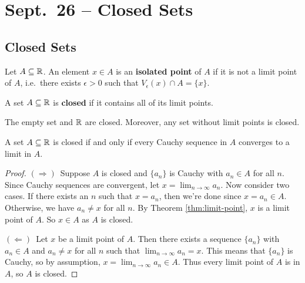 \chapter{Sept.~26 -- Closed Sets}

\section{Closed Sets}

\begin{definition}
  Let $A \subseteq \mathbb{R}$. An element $x \in A$ is
  an \textbf{isolated point} of $A$ if it is not
  a limit point of $A$, i.e.~there exists $\epsilon > 0$
  such that $V_\epsilon(x) \cap A = \{x\}$.
\end{definition}

\begin{definition}
  A set $A \subseteq \mathbb{R}$ is \textbf{closed}
  if it contains all of its limit points.
\end{definition}

\begin{example}
  The empty set and $\mathbb{R}$ are closed. Moreover, any
  set without limit points is closed.
\end{example}

\begin{theorem}
  A set $A \subseteq \mathbb{R}$ is closed if and only if
  every Cauchy sequence in $A$ converges to a
  limit in $A$.
\end{theorem}

\begin{proof}
  $(\Rightarrow)$\, Suppose $A$ is closed and
  $\{a_n\}$ is Cauchy with $a_n \in A$ for all $n$.
  Since Cauchy sequences are convergent, let
  $x = \lim_{n \to \infty} a_n$. Now consider two cases.
  If there exists an $n$ such that $x = a_n$, then we're
  done since $x = a_n \in A$. Otherwise, we have
  $a_n \ne x$ for all $n$. By Theorem \ref{thm:limit-point},
  $x$ is a limit point of $A$. So $x \in A$ as
  $A$ is closed.

  $(\Leftarrow)$\, Let $x$ be a limit point of $A$.
  Then there exists a sequence $\{a_n\}$ with $a_n \in A$
  and $a_n \ne x$ for all $n$ such that
  $\lim_{n \to \infty} a_n = x$. This means that
  $\{a_n\}$ is Cauchy, so by assumption,
  $x = \lim_{n \to \infty} a_n \in A$. Thus every limit
  point of $A$ is in $A$, so $A$ is closed.
\end{proof}

